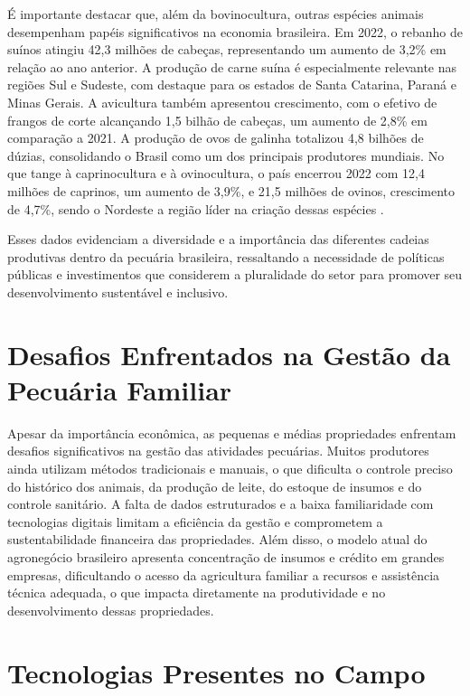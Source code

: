 É importante destacar que, além da bovinocultura, outras espécies animais desempenham papéis significativos na economia brasileira. Em 2022, o rebanho de suínos atingiu 42,3 milhões de cabeças, representando um aumento de 3,2\% em relação ao ano anterior. A produção de carne suína é especialmente relevante nas regiões Sul e Sudeste, com destaque para os estados de Santa Catarina, Paraná e Minas Gerais. A avicultura também apresentou crescimento, com o efetivo de frangos de corte alcançando 1,5 bilhão de cabeças, um aumento de 2,8\% em comparação a 2021. A produção de ovos de galinha totalizou 4,8 bilhões de dúzias, consolidando o Brasil como um dos principais produtores mundiais. No que tange à caprinocultura e à ovinocultura, o país encerrou 2022 com 12,4 milhões de caprinos, um aumento de 3,9\%, e 21,5 milhões de ovinos, crescimento de 4,7\%, sendo o Nordeste a região líder na criação dessas espécies \cite{agenciaBrasil2023}.

Esses dados evidenciam a diversidade e a importância das diferentes cadeias produtivas dentro da pecuária brasileira, ressaltando a necessidade de políticas públicas e investimentos que considerem a pluralidade do setor para promover seu desenvolvimento sustentável e inclusivo.

\section{Desafios Enfrentados na Gestão da Pecuária Familiar}
\label{sec:fundamentacao-teorica-desafios-pecuaria-familiar}

Apesar da importância econômica, as pequenas e médias propriedades enfrentam desafios significativos na gestão das atividades pecuárias. Muitos produtores ainda utilizam métodos tradicionais e manuais, o que dificulta o controle preciso do histórico dos animais, da produção de leite, do estoque de insumos e do controle sanitário. A falta de dados estruturados e a baixa familiaridade com tecnologias digitais limitam a eficiência da gestão e comprometem a sustentabilidade financeira das propriedades. Além disso, o modelo atual do agronegócio brasileiro apresenta concentração de insumos e crédito em grandes empresas, dificultando o acesso da agricultura familiar a recursos e assistência técnica adequada, o que impacta diretamente na produtividade e no desenvolvimento dessas propriedades.

\section{Tecnologias Presentes no Campo}
\label{sec:fundamentacao-teorica-tecnologias-campo}


